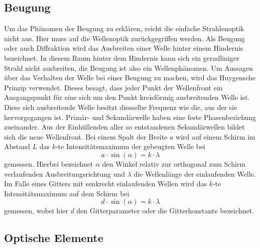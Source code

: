 \subsection{Beugung}
\label{sec:beugung}
Um das Phänomen der Beugung zu erklären, reicht die einfache Strahlenoptik nicht aus. Hier muss auf die Wellenoptik
zurückgegriffen werden. Als Beugung oder auch Diffraktion wird das Ausbreiten einer Welle hinter einem
Hindernis bezeichnet. In diesem Raum hinter dem Hindernis kann sich ein geradliniger Strahl nicht ausbreiten, die Beugung ist
also ein Wellenphänomen. Um Aussagen über das Verhalten der Welle bei einer Beugung zu machen, wird das Huygensche
Prinzip verwendet. Dieses besagt, dass jeder Punkt der Wellenfront ein Ausgangspunkt für eine sich um den Punkt kreisförmig
ausbreitenden Welle ist. Diese sich ausbreitende Welle besitzt diesselbe Frequenz wie die, aus der sie hervorgegangen
ist. Primär- und Sekundärwelle haben eine feste Phasenbeziehung zueinander. Aus der Einhüllenden aller so
entstandenen Sekundärwellen bildet sich die neue Wellenfront. Bei einem Spalt der Breite $a$ wird auf einem Schirm
im Abstand $L$ das $k$-te Intensitätsmaximum der gebeugten Welle bei
\begin{equation}
  \label{eqn:spaltintmax}
  a \cdot \sin(\alpha) = k \cdot \lambda
\end{equation}
gemessen. Hierbei bezeichnet $\alpha$ den Winkel relativ zur orthogonal zum Schirm verlaufenden Ausbreitungsrichtung
und $\lambda$ die Wellenlänge der einlaufenden Welle.
Im Falle eines Gitters mit senkrecht einlaufenden Wellen wird das $k$-te Intensitätsmaximum auf dem Schirm bei
\begin{equation}
  \label{eqn:gitterintmax}
  d \cdot \sin(\alpha) = k \cdot \lambda
\end{equation}
gemessen, wobei hier $d$ den Gitterparameter oder die Gitterkonstante bezeichnet.

\subsection{Optische Elemente}
\label{sec:optischeelemente}

